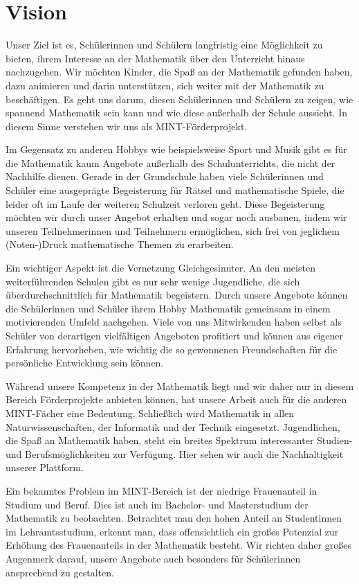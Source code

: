 \documentclass[12pt]{zettel}
\begin{document}
\section{Vision}

Unser Ziel ist es, Schülerinnen und Schülern
langfristig eine Möglichkeit zu bieten, ihrem Interesse an der
Mathematik über den Unterricht hinaus nachzugehen. Wir möchten Kinder, die Spaß an der
Mathematik gefunden haben, dazu animieren und darin unterstützen, sich weiter mit der Mathematik zu beschäftigen. Es geht uns darum, diesen Schülerinnen und
Schülern zu zeigen, wie spannend Mathematik sein kann und wie diese außerhalb der Schule aussieht. In diesem Sinne verstehen wir uns als MINT-Förderprojekt.

Im Gegensatz zu anderen Hobbys wie beispielsweise Sport und Musik gibt es für die Mathematik kaum Angebote außerhalb des Schulunterrichts, die nicht der Nachhilfe dienen. Gerade in der Grundschule haben viele Schülerinnen und Schüler eine ausgeprägte Begeisterung für
Rätsel und mathematische Spiele, die leider oft im Laufe der weiteren
Schulzeit verloren geht. Diese Begeisterung möchten wir
durch unser Angebot erhalten und sogar noch ausbauen, indem wir
unseren Teilnehmerinnen und Teilnehmern ermöglichen, sich frei von jeglichem
(Noten-)Druck mathematische Themen zu erarbeiten.

Ein wichtiger Aspekt ist die Vernetzung Gleichgesinnter. An
den meisten weiterführenden Schulen gibt es nur sehr wenige Jugendliche, die sich überdurchschnittlich für Mathematik begeistern. Durch unsere Angebote können die
Schülerinnen und Schüler ihrem Hobby Mathematik gemeinsam in einem motivierenden Umfeld nachgehen.  Viele von uns Mitwirkenden haben selbst als Schüler von derartigen vielfältigen Angeboten profitiert und können aus eigener Erfahrung hervorheben, wie wichtig die so gewonnenen Freundschaften für die persönliche Entwicklung sein können.

Während unsere Kompetenz in der Mathematik liegt und wir daher nur in diesem Bereich Förderprojekte anbieten können, hat unsere Arbeit auch für die anderen MINT-Fächer eine Bedeutung. Schließlich wird Mathematik in allen Naturwissenschaften, der Informatik und der Technik eingesetzt. Jugendlichen, die Spaß an Mathematik haben, steht ein breites Spektrum interessanter Studien- und Berufsmöglichkeiten zur Verfügung. Hier sehen wir auch die Nachhaltigkeit unserer Plattform.

Ein bekanntes Problem im MINT-Bereich ist der niedrige Frauenanteil in Studium und Beruf. Dies ist auch im Bachelor- und Masterstudium der Mathematik zu beobachten. Betrachtet man den hohen Anteil an Studentinnen im Lehramtsstudium, erkennt man, dass offensichtlich ein großes Potenzial zur Erhöhung des Frauenanteils in der Mathematik besteht. Wir richten daher großes Augenmerk darauf, unsere Angebote auch besonders für Schülerinnen ansprechend zu gestalten.
\end{document}
